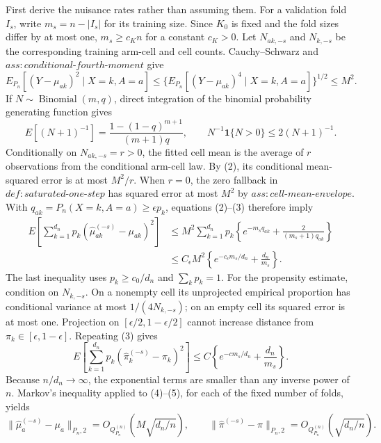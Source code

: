 First derive the nuisance rates rather than assuming them.  For a validation
fold \(I_s\), write \(m_s=n-|I_s|\) for its training size.  Since \(K_0\) is
fixed and the fold sizes differ by at most one, \(m_s\ge c_Kn\) for a constant
\(c_K>0\).  Let \(N_{ak,-s}\) and \(N_{k,-s}\) be the corresponding training
arm-cell and cell counts.  Cauchy--Schwarz and
\(ass:conditional\text{-}fourth\text{-}moment\) give
\[
 E_{P_n}[(Y-\mu_{ak})^2\mid X=k,A=a]
 \le
 \{E_{P_n}[(Y-\mu_{ak})^4\mid X=k,A=a]\}^{1/2}
 \le M^2.
\tag{2}
\]
If \(N\sim\operatorname{Binomial}(m,q)\), direct integration of the binomial
probability generating function gives
\[
 E[(N+1)^{-1}]=\frac{1-(1-q)^{m+1}}{(m+1)q},
 \qquad
 N^{-1}\mathbf1\{N>0\}\le2(N+1)^{-1}.
\tag{3}
\]
Conditionally on \(N_{ak,-s}=r>0\), the fitted cell mean is the average of
\(r\) observations from the conditional arm-cell law.  By (2), its conditional
mean-squared error is at most \(M^2/r\).  When \(r=0\), the zero fallback in
\(def:saturated\text{-}one\text{-}step\) has squared error at most \(M^2\) by
\(ass:cell\text{-}mean\text{-}envelope\).  With
\(q_{ak}=P_n(X=k,A=a)\ge\epsilon p_k\), equations (2)--(3) therefore imply
\[
\begin{aligned}
 E\!\left[\sum_{k=1}^{d_n}p_k
  (\widehat\mu_{ak}^{(-s)}-\mu_{ak})^2\right]
 &\le M^2\sum_{k=1}^{d_n}p_k
 \left\{e^{-m_sq_{ak}}+\frac{2}{(m_s+1)q_{ak}}\right\}\\
 &\le C_\epsilon M^2
 \left\{e^{-c_\epsilon m_s/d_n}+\frac{d_n}{m_s}\right\}.
\end{aligned}
\tag{4}
\]
The last inequality uses \(p_k\ge c_0/d_n\) and
\(\sum_kp_k=1\).  For the propensity estimate, condition on
\(N_{k,-s}\).  On a nonempty cell its unprojected empirical proportion has
conditional variance at most \(1/(4N_{k,-s})\); on an empty cell its squared
error is at most one.  Projection on
\([\epsilon/2,1-\epsilon/2]\) cannot increase distance from
\(\pi_k\in[\epsilon,1-\epsilon]\).  Repeating (3) gives
\[
 E\!\left[\sum_{k=1}^{d_n}p_k
  (\widehat\pi_k^{(-s)}-\pi_k)^2\right]
 \le C\left\{e^{-c m_s/d_n}+\frac{d_n}{m_s}\right\}.
\tag{5}
\]
Because \(n/d_n\to\infty\), the exponential terms are smaller than any
inverse power of \(n\).  Markov's inequality applied to (4)--(5), for each of
the fixed number of folds, yields
\[
 \|\widehat\mu_a^{(-s)}-\mu_a\|_{P_n,2}
   =O_{Q_{P_n}^{(n)}}(M\sqrt{d_n/n}),
 \qquad
 \|\widehat\pi^{(-s)}-\pi\|_{P_n,2}
   =O_{Q_{P_n}^{(n)}}(\sqrt{d_n/n}).
\tag{6}
\]

